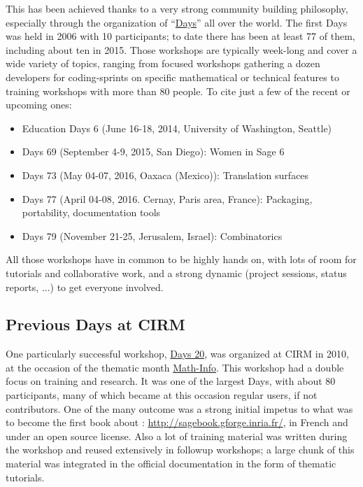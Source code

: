 \documentclass[12pt]{amsart}
\begin{document}
This has been achieved thanks to a very strong community building
philosophy, especially through the organization of
“\href{https://wiki.sagemath.org/Workshops}{\Sage Days}” all over the
world. The first \Sage Days was held in 2006 with 10 participants; to
date there has been at least 77 of them, including about ten in
2015. Those workshops are typically week-long and cover a wide
variety of topics, ranging from focused workshops gathering a dozen
developers for coding-sprints on specific mathematical or technical
features to training workshops with more than 80 people. To cite just
a few of the recent or upcoming ones:

\begin{itemize}
\item \Sage Education Days 6 (June 16-18, 2014, University of
  Washington, Seattle)
\item \Sage Days 69 (September 4-9, 2015, San Diego): Women in Sage 6
\item \Sage Days 73 (May 04-07, 2016, Oaxaca (Mexico)): Translation surfaces
\item \Sage Days 77 (April 04-08, 2016. Cernay, Paris area, France):
  Packaging, portability, documentation tools
\item \Sage Days 79 (November 21-25, Jerusalem, Israel): Combinatorics
\end{itemize}

All those workshops have in common to be highly hands on, with lots of
room for tutorials and collaborative work, and a strong dynamic
(project sessions, status reports, ...) to get everyone involved.

\subsection{Previous \Sage Days at CIRM}

One particularly successful workshop,
\href{https://www.lirmm.fr/arith/wiki/MathInfo2010/SageDays}{\Sage
  Days 20}, was organized at CIRM in 2010, at the occasion of the
thematic month
\href{https://www.lirmm.fr/arith/wiki/MathInfo2010/}{Math-Info}. This
workshop had a double focus on training and research. It was one of
the largest \Sage Days, with about 80 participants, many of which
became at this occasion regular \Sage users, if not contributors. One
of the many outcome was a strong initial impetus to what was to become
the first book about \Sage: \href{Calcul Mathématique avec
  Sage}{http://sagebook.gforge.inria.fr/}, in French and under an open
source license. Also a lot of training material was written during the
workshop and reused extensively in followup workshops; a large chunk
of this material was integrated in the \Sage official documentation in
the form of thematic tutorials.
\end{document}
